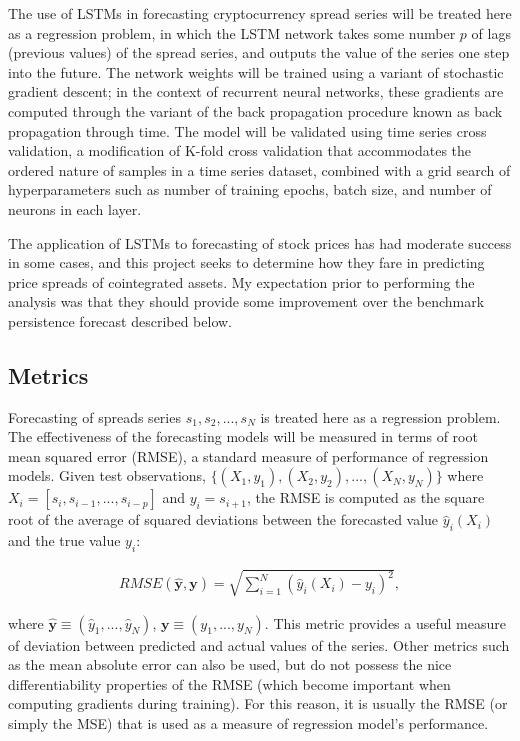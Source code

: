 \documentclass{article}
\begin{document}
The use of LSTMs in forecasting cryptocurrency spread series will be treated here as a regression problem, in which the LSTM network takes some number $p$ of lags (previous values) of the spread series, and outputs the value of the series one step into the future. The network weights will be trained using a variant of stochastic gradient descent; in the context of recurrent neural networks, these gradients are computed through the variant of the back propagation procedure known as back propagation through time. The model will be validated using time series cross validation, a modification of K-fold cross validation that accommodates the ordered nature of samples in a time series dataset, combined with a grid search of hyperparameters such as number of training epochs, batch size, and number of neurons in each layer.  

The application of LSTMs to forecasting of stock prices has had moderate success in some cases, and this project seeks to determine how they fare in predicting price spreads of cointegrated assets. My expectation prior to performing the analysis was that they should provide some improvement over the benchmark persistence forecast described below. 



\subsection{Metrics}

Forecasting of spreads series $s_{1}, s_{2}, ..., s_{N}$ is treated here as a regression problem. The effectiveness of the forecasting models will be measured in terms of root mean squared error (RMSE), a standard measure of performance of regression models. Given test observations, 
$\{(X_{1}, y_{1}), (X_{2}, y_{2}), ...,  (X_{N}, y_{N}) \}$ where $X_{i} = [s_{i}, s_{i-1}, ..., s_{i-p}]$ and $y_{i} = s_{i+1}$,
the RMSE is computed as the square root of the average of squared deviations between the forecasted value $\hat{y}_{i}(X_{i})$ and the true value $y_{i}$:

\begin{align}
RMSE(\boldsymbol{\hat{y}}, \boldsymbol{y}) = \sqrt{\sum_{i=1}^{N} \left(\hat{y}_{i}(X_{i}) - y_{i}\right)^{2} },
\end{align}

\noindent where $\boldsymbol{\hat{y}} \equiv (\hat{y}_{1}, ... , \hat{y}_{N})$, $\boldsymbol{y} \equiv (y_{1}, ... , y_{N})$. This metric provides a useful measure of deviation between predicted and actual values of the series. Other metrics such as the mean absolute error can also be used, but do not possess the nice differentiability properties of the RMSE (which become important when computing gradients during training). For this reason, it is usually the RMSE (or simply the MSE) that is used as a measure of regression model's performance. 
\end{document}
